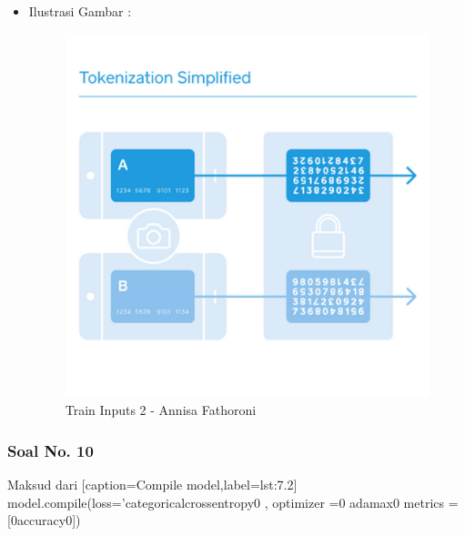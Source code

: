 \begin{itemize}
\item Ilustrasi Gambar :

    \begin{figure}[!hbtp]
    \centering
    \includegraphics[scale=0.4]{figures/Chapter 7/1164067/Teori/Chapter7AnnisaFathoroni1.jpg}
    \caption{Train Inputs 2 - Annisa Fathoroni}
    \label{Train Inputs 2 - Annisa Fathoroni}
    \end{figure}
\end{itemize}

\subsubsection{Soal No. 10}
Maksud dari [caption=Compile model,label=lst:7.2] model.compile(loss=’categoricalcrossentropy0 , optimizer =0 adamax0 metrics = [0accuracy0])

